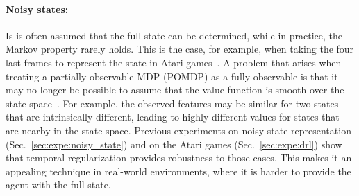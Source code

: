 \documentclass{article}
\begin{document}
\paragraph{Noisy states:}
Is is often assumed that the full state can be determined, while in practice, the Markov property rarely holds. This is the case, for example, when taking the four last frames to represent the state in Atari games~\citep{mnih2015human}. 
A problem that arises when treating a partially observable MDP (POMDP) as a fully observable is that it may no longer be possible to assume that the value function is smooth over the state space~\citep{singh1994learning}.
For example, the observed features may be similar for two states that are intrinsically different, leading to highly different values for states that are nearby in the state space. Previous experiments on noisy state representation (Sec.~\ref{sec:expe:noisy_state}) and on the Atari games (Sec.~\ref{sec:expe:drl}) show that temporal regularization provides robustness to those cases. This makes it an appealing technique in real-world environments, where it is harder to provide the agent with the full state.
\end{document}
